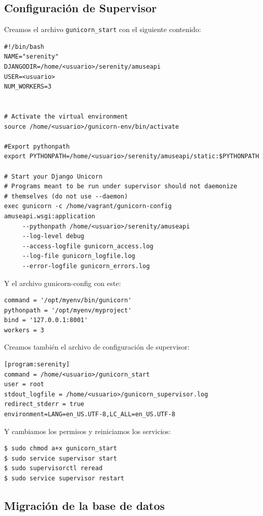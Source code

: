 \subsection{Configuración de Supervisor}

Creamos el archivo \texttt{gunicorn\_start} con el siguiente contenido:

\begin{verbatim}
#!/bin/bash
NAME="serenity"
DJANGODIR=/home/<usuario>/serenity/amuseapi
USER=<usuario>
NUM_WORKERS=3


# Activate the virtual environment
source /home/<usuario>/gunicorn-env/bin/activate

#Export pythonpath
export PYTHONPATH=/home/<usuario>/serenity/amuseapi/static:$PYTHONPATH

# Start your Django Unicorn
# Programs meant to be run under supervisor should not daemonize
# themselves (do not use --daemon)
exec gunicorn -c /home/vagrant/gunicorn-config amuseapi.wsgi:application
     --pythonpath /home/<usuario>/serenity/amuseapi
     --log-level debug
     --access-logfile gunicorn_access.log
     --log-file gunicorn_logfile.log
     --error-logfile gunicorn_errors.log
\end{verbatim}


Y el archivo gunicorn-config con este:

\begin{verbatim}
command = '/opt/myenv/bin/gunicorn'
pythonpath = '/opt/myenv/myproject'
bind = '127.0.0.1:8001'
workers = 3
\end{verbatim}

Creamos también el archivo de configuración de supervisor:

\begin{verbatim}
[program:serenity]
command = /home/<usuario>/gunicorn_start
user = root
stdout_logfile = /home/<usuario>/gunicorn_supervisor.log
redirect_stderr = true
environment=LANG=en_US.UTF-8,LC_ALL=en_US.UTF-8
\end{verbatim}

Y cambiamos los permisos y reiniciamos los servicios:

\begin{verbatim}
$ sudo chmod a+x gunicorn_start
$ sudo service supervisor start
$ sudo supervisorctl reread
$ sudo service supervisor restart
\end{verbatim}

\subsection{Migración de la base de datos}

